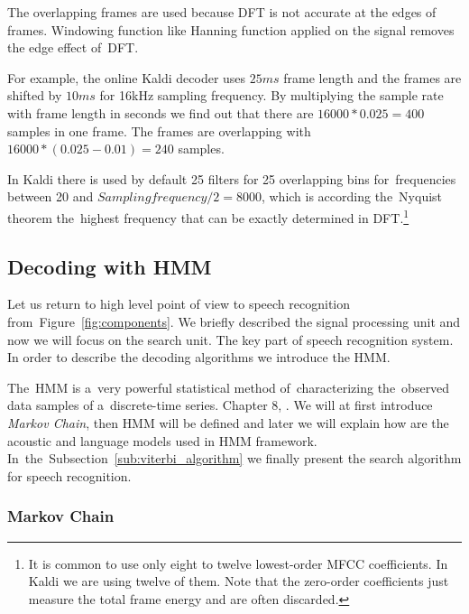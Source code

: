 The overlapping frames are used because \ac{DFT} is not accurate at the edges of frames. 
Windowing function like Hanning function applied on the signal removes the edge effect of~\ac{DFT}. 

For example,  the online Kaldi decoder uses $25ms$  frame length and the frames are shifted by $10ms$ for 16kHz sampling frequency. By multiplying the sample rate with frame length in seconds we find out that there are $16000 * 0.025 = 400$ samples in one frame. The frames are overlapping with $ 16000 * (0.025 - 0.01) = 240$ samples.

In Kaldi there is used by default 25 filters for 25 overlapping bins for~frequencies 
between 20 and $Sampling frequency / 2 = 8000$, which is according the~Nyquist theorem\cite{jerri1977shannon} 
the~highest frequency that can be exactly determined in \ac{DFT}.\footnote{ It is common to use only eight to twelve 
    lowest-order \ac{MFCC} coefficients. In Kaldi we are using twelve of them. 
    Note that the zero-order coefficients just measure the total frame energy and are often discarded.
}

\subsection{Decoding with \ac{HMM}}
\label{sub:decoding_with_hmm}
Let us return to high level point of view to speech recognition from~Figure~\ref{fig:components}.
We briefly described the signal processing unit and now we will focus on the search unit. 
The key part of speech recognition system. In order to describe the decoding algorithms we introduce the \acl{HMM}. 

The~\acl{HMM} is a~very powerful statistical method of~characterizing the~observed data samples of 
a~discrete-time series. Chapter 8, \cite{huang2001spoken}.
We will at first introduce {\it Markov Chain}, then \ac{HMM} will be defined and later we will explain how are the acoustic and language models used in \ac{HMM} framework. In~the~Subsection~\ref{sub:viterbi_algorithm} we finally present the search algorithm for speech recognition.

\subsubsection*{Markov Chain}
\label{ssub:markov_chain}




